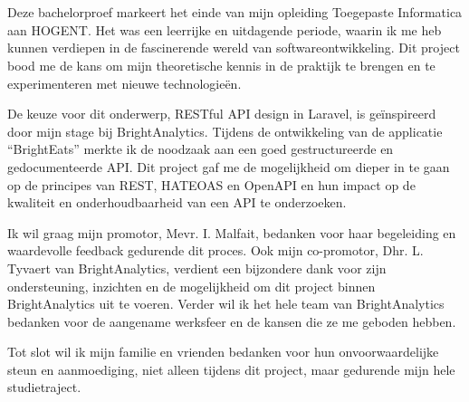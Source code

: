 
\chapter*{}%
\label{ch:voorwoord}

Deze bachelorproef markeert het einde van mijn opleiding Toegepaste Informatica aan HOGENT. Het was een leerrijke en uitdagende periode, waarin ik me heb kunnen verdiepen in de fascinerende wereld van softwareontwikkeling. Dit project bood me de kans om mijn theoretische kennis in de praktijk te brengen en te experimenteren met nieuwe technologieën.

\bigskip

De keuze voor dit onderwerp, RESTful API design in Laravel, is geïnspireerd door mijn stage bij BrightAnalytics. Tijdens de ontwikkeling van de applicatie ``BrightEats'' merkte ik de noodzaak aan een goed gestructureerde en gedocumenteerde API. Dit project gaf me de mogelijkheid om dieper in te gaan op de principes van REST, HATEOAS en OpenAPI en hun impact op de kwaliteit en onderhoudbaarheid van een API te onderzoeken.

\bigskip

Ik wil graag mijn promotor, Mevr. I. Malfait, bedanken voor haar begeleiding en waardevolle feedback gedurende dit proces. Ook mijn co-promotor, Dhr. L. Tyvaert van BrightAnalytics, verdient een bijzondere dank voor zijn ondersteuning, inzichten en de mogelijkheid om dit project binnen BrightAnalytics uit te voeren. Verder wil ik het hele team van BrightAnalytics bedanken voor de aangename werksfeer en de kansen die ze me geboden hebben.

\bigskip

Tot slot wil ik mijn familie en vrienden bedanken voor hun onvoorwaardelijke steun en aanmoediging, niet alleen tijdens dit project, maar gedurende mijn hele studie\-traject.
